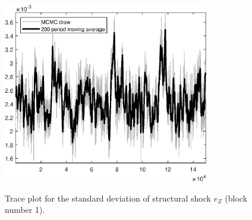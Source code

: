 \begin{figure}[H]
\centering
  \includegraphics[width=0.8\textwidth]{BRS_gen/graphs/TracePlot_SE_e_Z_blck_1}\\
    \caption{Trace plot for the standard deviation of structural shock ${e_Z}$ (block number 1).}
\end{figure}
